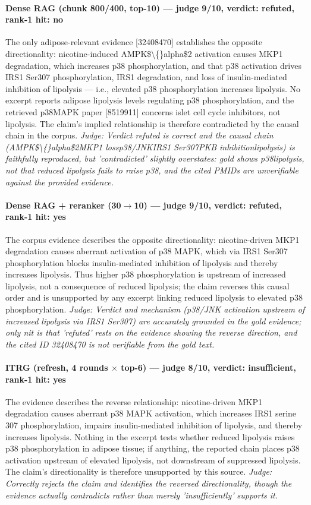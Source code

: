\documentclass[sigconf, review, anonymous]{acmart}
\begin{document}
\paragraph{Dense RAG (chunk 800/400, top-10) --- judge 9/10, verdict: refuted, rank-1 hit: no}
\noindent The only adipose-relevant evidence [32408470] establishes the opposite directionality: nicotine-induced AMPK\$\textbackslash\{\}alpha\$2 activation causes MKP1 degradation, which increases p38 phosphorylation, and that p38 activation drives IRS1 Ser307 phosphorylation, IRS1 degradation, and loss of insulin-mediated inhibition of lipolysis --- i.e., elevated p38 phosphorylation increases lipolysis. No excerpt reports adipose lipolysis levels regulating p38 phosphorylation, and the retrieved p38MAPK paper [8519911] concerns islet cell cycle inhibitors, not lipolysis. The claim's implied relationship is therefore contradicted by the causal chain in the corpus.
\noindent\small\textit{Judge: Verdict refuted is correct and the causal chain (AMPK\$\textbackslash\{\}alpha\$2MKP1 lossp38/JNKIRS1 Ser307PKB inhibitionlipolysis) is faithfully reproduced, but 'contradicted' slightly overstates: gold shows p38lipolysis, not that reduced lipolysis fails to raise p38, and the cited PMIDs are unverifiable against the provided evidence.}
\paragraph{Dense RAG + reranker (30$\to$10) --- judge 9/10, verdict: refuted, rank-1 hit: yes}
\noindent The corpus evidence describes the opposite directionality: nicotine-driven MKP1 degradation causes aberrant activation of p38 MAPK, which via IRS1 Ser307 phosphorylation blocks insulin-mediated inhibition of lipolysis and thereby increases lipolysis. Thus higher p38 phosphorylation is upstream of increased lipolysis, not a consequence of reduced lipolysis; the claim reverses this causal order and is unsupported by any excerpt linking reduced lipolysis to elevated p38 phosphorylation.
\noindent\small\textit{Judge: Verdict and mechanism (p38/JNK activation upstream of increased lipolysis via IRS1 Ser307) are accurately grounded in the gold evidence; only nit is that 'refuted' rests on the evidence showing the reverse direction, and the cited ID 32408470 is not verifiable from the gold text.}
\paragraph{ITRG (refresh, 4 rounds $\times$ top-6) --- judge 8/10, verdict: insufficient, rank-1 hit: yes}
\noindent The evidence describes the reverse relationship: nicotine-driven MKP1 degradation causes aberrant p38 MAPK activation, which increases IRS1 serine 307 phosphorylation, impairs insulin-mediated inhibition of lipolysis, and thereby increases lipolysis. Nothing in the excerpt tests whether reduced lipolysis raises p38 phosphorylation in adipose tissue; if anything, the reported chain places p38 activation upstream of elevated lipolysis, not downstream of suppressed lipolysis. The claim's directionality is therefore unsupported by this source.
\noindent\small\textit{Judge: Correctly rejects the claim and identifies the reversed directionality, though the evidence actually contradicts rather than merely 'insufficiently' supports it.}
\end{document}
